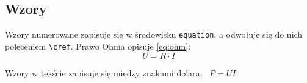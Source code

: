 \subsection{Wzory}

Wzory numerowane zapisuje się w środowisku \texttt{equation}, a odwołuje się do nich
poleceniem \verb|\cref|. Prawo Ohma opisuje \cref{eq:ohm}:
\begin{equation}
    U = R \cdot I
    \label{eq:ohm}
\end{equation}

Wzory w tekście zapisuje się między znakami dolara, \np{}~$P = U I$.
